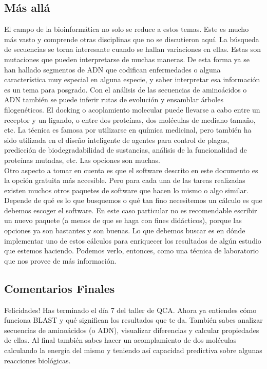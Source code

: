 \documentclass[10pt,letterpaper]{article}
\begin{document}
\subsection{M\'as all\'a}
El campo de la bioinform\'atica no solo se reduce a estos temas. Este es mucho m\'as vasto y comprende otras disciplinas que no se discutieron aqu\'i. La b\'usqueda de secuencias se torna interesante cuando se hallan variaciones en ellas. Estas son mutaciones que pueden interpretarse de muchas maneras. De esta forma ya se han hallado segmentos de ADN que codifican enfermedades o alguna caracter\'istica muy especial en alguna especie, y saber interpretar esa informaci\'on es un tema para posgrado. Con el an\'alisis de las secuencias de amino\'acidos o ADN tambi\'en se puede inferir rutas de evoluci\'on y ensamblar \'arboles filogen\'eticos. El docking o acoplamiento molecular puede llevarse a cabo entre un receptor y un ligando, o entre dos prote\'inas, dos mol\'eculas de mediano tama\~no, etc. La t\'ecnica es famosa por utilizarse en qu\'imica medicinal, pero tambi\'en ha sido utilizada en el dise\~no inteligente de agentes para control de plagas, predicci\'on de biodegradabilidad de sustancias, an\'alisis de la funcionalidad de prote\'inas mutadas, etc. Las opciones son muchas.\\

Otro aspecto a tomar en cuenta es que el software descrito en este documento es la opci\'on gratuita m\'as accesible. Pero para cada una de las tareas realizadas existen muchos otros paquetes de software que hacen lo mismo o algo similar. Depende de qu\'e es lo que busquemos o qu\'e tan fino necesitemos un c\'alculo es que debemos escoger el software. En este caso particular no es recomendable escribir un nuevo paquete (a menos de que se haga con fines did\'acticos), porque las opciones ya son bastantes y son buenas. Lo que debemos buscar es en d\'onde implementar uno de estos c\'alculos para enriquecer los resultados de alg\'un estudio que estemos haciendo. Podemos verlo, entonces, como una t\'ecnica de laboratorio que nos provee de m\'as informaci\'on.

\subsection{Comentarios Finales}

Felicidades! Has terminado el d\'ia 7 del taller de QCA. Ahora ya entiendes c\'omo funciona BLAST y qu\'e significan los resultados que te da. Tambi\'en sabes analizar secuencias de amino\'acidos (o ADN), visualizar diferencias y calcular propiedades de ellas. Al final tambi\'en sabes hacer un acomplamiento de dos mol\'eculas calculando la energ\'ia del mismo y teniendo as\'i capacidad predictiva sobre algunas reacciones biol\'ogicas.\\
\end{document}
